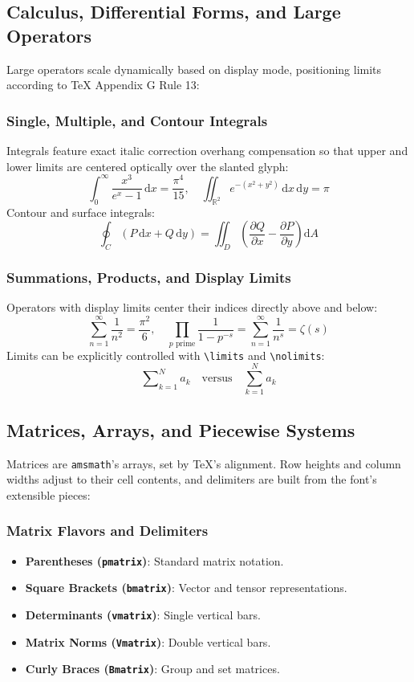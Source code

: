 \documentclass[11pt, a4paper]{article}
\begin{document}
\subsection{Calculus, Differential Forms, and Large Operators}
Large operators scale dynamically based on display mode, positioning limits according to TeX Appendix G Rule 13:

\subsubsection{Single, Multiple, and Contour Integrals}
Integrals feature exact italic correction overhang compensation so that upper and lower limits are centered optically over the slanted glyph:
\[
\int_0^\infty \frac{x^3}{e^x - 1} \, \mathrm{d}x = \frac{\pi^4}{15}, \quad \iint_{\mathbb{R}^2} e^{-(x^2 + y^2)} \, \mathrm{d}x \, \mathrm{d}y = \pi
\]
Contour and surface integrals:
\[
\oint_C (P \, \mathrm{d}x + Q \, \mathrm{d}y) = \iint_D \left( \frac{\partial Q}{\partial x} - \frac{\partial P}{\partial y} \right) \mathrm{d}A
\]

\subsubsection{Summations, Products, and Display Limits}
Operators with display limits center their indices directly above and below:
\[
\sum_{n=1}^\infty \frac{1}{n^2} = \frac{\pi^2}{6}, \quad \prod_{p \text{ prime}} \frac{1}{1 - p^{-s}} = \sum_{n=1}^\infty \frac{1}{n^s} = \zeta(s)
\]
Limits can be explicitly controlled with \verb|\limits| and \verb|\nolimits|:
\[
\sum\nolimits_{k=1}^N a_k \quad \text{versus} \quad \sum\limits_{k=1}^N a_k
\]

\subsection{Matrices, Arrays, and Piecewise Systems}
Matrices are \texttt{amsmath}'s arrays, set by TeX's alignment. Row heights and column widths adjust to their cell contents, and delimiters are built from the font's extensible pieces:

\subsubsection{Matrix Flavors and Delimiters}
\begin{itemize}
\item \textbf{Parentheses (\texttt{pmatrix})}: Standard matrix notation.
\item \textbf{Square Brackets (\texttt{bmatrix})}: Vector and tensor representations.
\item \textbf{Determinants (\texttt{vmatrix})}: Single vertical bars.
\item \textbf{Matrix Norms (\texttt{Vmatrix})}: Double vertical bars.
\item \textbf{Curly Braces (\texttt{Bmatrix})}: Group and set matrices.
\end{itemize}
\end{document}
